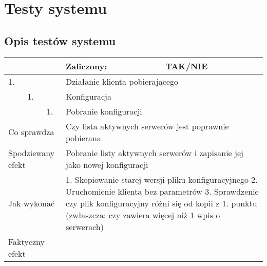 \chapter{Testy systemu}
\label{ap:2}

\section{Opis testów systemu}

\begin{tabular}{|p{20pt}|p{20pt}|p{20pt}|p{250pt}|p{60pt}|}
	\hline
	\multicolumn{3}{|p{70pt}|}{} & Zaliczony: & TAK/NIE \\ \hline
	1. & & & \multicolumn{2}{|p{310pt}|}{Działanie klienta pobierającego } \\ \hline
	& 1. & & \multicolumn{2}{|p{310pt}|}{Konfiguracja } \\ \hline
	& & 1. & \multicolumn{2}{|p{310pt}|}{Pobranie konfiguracji } \\ \hline
	\multicolumn{3}{|p{70pt}|}{Co sprawdza} & \multicolumn{2}{|p{310pt}|}{Czy lista aktywnych serwerów jest poprawnie pobierana} \\ \hline
	\multicolumn{3}{|p{70pt}|}{Spodziewany efekt} & \multicolumn{2}{|p{310pt}|}{Pobranie listy aktywnych serwerów i zapisanie jej jako nowej konfiguracji} \\ \hline
	\multicolumn{3}{|p{70pt}|}{Jak wykonać} & \multicolumn{2}{|p{310pt}|}{1. Skopiowanie starej wersji pliku konfiguracyjnego 
2. Uruchomienie klienta bez parametrów
3. Sprawdzenie czy plik konfiguracyjny różni się od kopii z 1. punktu (zwłaszcza: czy zawiera więcej niż 1 wpis o serwerach)} \\ \hline
	\multicolumn{3}{|p{70pt}|}{Faktyczny efekt} & \multicolumn{2}{|p{310pt}|}{} \\ \hline
\end{tabular}

